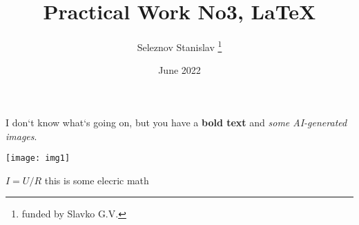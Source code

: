 \documentclass[12pt, a4paper]{article}
\title{Practical Work No3, LaTeX}
\author{Seleznov Stanislav \thanks{funded by Slavko G.V.}}
\date{June 2022}
\begin{document}
\maketitle
I don`t know what`s going on, but you have a \textbf{bold text} and \emph{some AI-generated images}.

\texttt{[image: img1]}

    $I = U/R$ this is some elecric math \\
\end{document}

